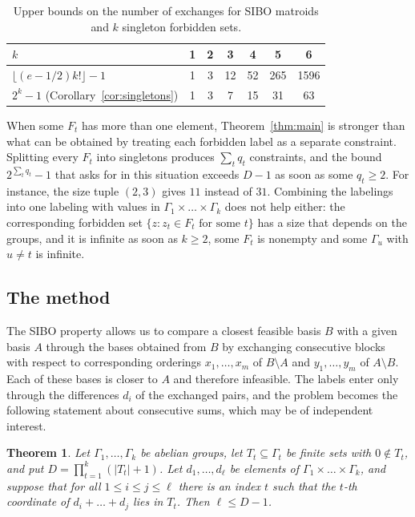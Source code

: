 \documentclass{amsart}
\newtheorem{theorem}{Theorem}[section]
\theoremstyle{definition}
\theoremstyle{remark}
\begin{document}
\begin{table}[ht]
\caption{Upper bounds on the number of exchanges for SIBO matroids and $k$ singleton forbidden sets.}\label{tab:compare}
\begin{tabular}{l|cccccc}
$k$ & 1 & 2 & 3 & 4 & 5 & 6\\
\hline
$\lfloor(e-1/2)k!\rfloor-1$ \cite{GMOSY} & 1 & 3 & 12 & 52 & 265 & 1596\\
$2^k-1$ (Corollary~\ref{cor:singletons}) & 1 & 3 & 7 & 15 & 31 & 63
\end{tabular}
\end{table}

When some $F_t$ has more than one element, Theorem~\ref{thm:main} is stronger than what can be obtained by treating each forbidden label as a separate constraint. Splitting every $F_t$ into singletons produces $\sum_t q_t$ constraints, and the bound $2^{\sum_t q_t}-1$ that \cite[Question~6.2]{GMOSY} asks for in this situation exceeds $D-1$ as soon as some $q_t\ge2$. For instance, the size tuple $(2,3)$ gives $11$ instead of $31$. Combining the labelings into one labeling with values in $\Gamma_1\times\dots\times\Gamma_k$ does not help either: the corresponding forbidden set $\{z: z_t\in F_t\text{ for some }t\}$ has a size that depends on the groups, and it is infinite as soon as $k\ge2$, some $F_t$ is nonempty and some $\Gamma_u$ with $u\ne t$ is infinite.

\subsection*{The method}
The SIBO property allows us to compare a closest feasible basis $B$ with a given basis $A$ through the bases obtained from $B$ by exchanging consecutive blocks with respect to corresponding orderings $x_1,\dots,x_m$ of $B\setminus A$ and $y_1,\dots,y_m$ of $A\setminus B$. Each of these bases is closer to $A$ and therefore infeasible. The labels enter only through the differences $d_i$ of the exchanged pairs, and the problem becomes the following statement about consecutive sums, which may be of independent interest.

\begin{theorem}\label{thm:interval}
Let $\Gamma_1,\dots,\Gamma_k$ be abelian groups, let $T_t\subseteq\Gamma_t$ be finite sets with $0\notin T_t$, and put $D=\prod_{t=1}^k(|T_t|+1)$. Let $d_1,\dots,d_\ell$ be elements of $\Gamma_1\times\dots\times\Gamma_k$, and suppose that for all $1\le i\le j\le\ell$ there is an index $t$ such that the $t$-th coordinate of $d_i+\dots+d_j$ lies in $T_t$. Then $\ell\le D-1$.
\end{theorem}
\end{document}
